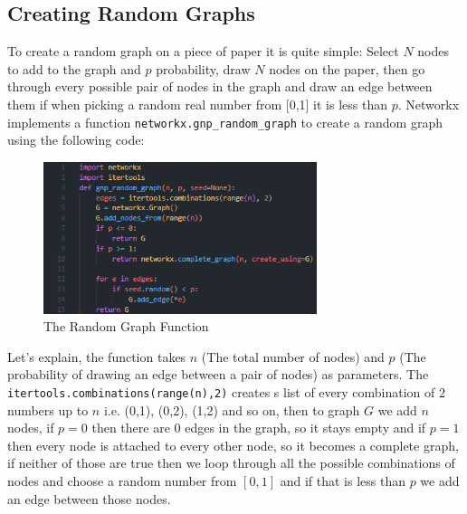 \documentclass{article}
\begin{document}
        \subsection{Creating Random Graphs}
        To create a random graph on a piece of paper it is quite simple: Select $N$ nodes to add to the graph and $p$ probability, draw $N$ nodes on the paper, then go through every possible pair of nodes in the graph and draw an edge between them if when picking a random real number from [0,1] it is less than $p$. Networkx implements a function \verb|networkx.gnp_random_graph| to create a random graph using the following code:\\
        \begin{figure}[H]
            \includegraphics[width=8cm]{images/CreatingRandomGraphs.png}
            \caption{The Random Graph Function}
            \label{fig:RandomGraph1}
        \end{figure}
        Let's explain, the function takes $n$ (The total number of nodes) and $p$ (The probability of drawing an edge between a pair of nodes) as parameters. The \verb|itertools.combinations(range(n),2)| creates s list of every combination of 2 numbers up to $n$ i.e. (0,1), (0,2), (1,2) and so on, then to graph $G$ we add $n$ nodes, if $p = 0$ then there are 0 edges in the graph, so it stays empty and if $p =1$ then every node is attached to every other node, so it becomes a complete graph, if neither of those are true then we loop through all the possible combinations of nodes and choose a random number from $[0,1]$ and if that is less than $p$ we add an edge between those nodes.
\end{document}
